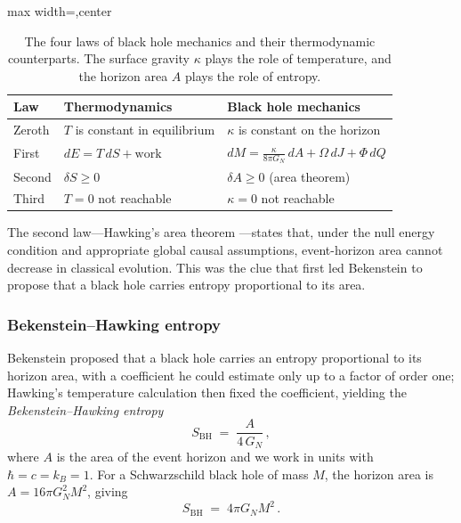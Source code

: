 \documentclass[11pt,letterpaper]{article}
\theoremstyle{plain}
\theoremstyle{definition}
\theoremstyle{remark}
\begin{document}
\begin{table}[ht]
\centering
\caption{The four laws of black hole mechanics and their thermodynamic
counterparts.  The surface gravity $\kappa$ plays the role of temperature,
and the horizon area $A$ plays the role of entropy.}
\label{tab03:four_laws}
\begin{adjustbox}{max width=\textwidth,center}
\begin{tabular}{@{}lll@{}}
\toprule
\textbf{Law} & \textbf{Thermodynamics} & \textbf{Black hole mechanics} \\
\midrule
Zeroth & $T$ is constant in equilibrium & $\kappa$ is constant on the horizon \\
First  & $dE = T\, dS + \text{work}$ & $dM = \frac{\kappa}{8\pi G_{N}}\, dA + \Omega\, dJ + \Phi\, dQ$ \\
Second & $\delta S \geq 0$ & $\delta A \geq 0$ (area theorem) \\
Third  & $T = 0$ not reachable & $\kappa = 0$ not reachable \\
\bottomrule
\end{tabular}
\end{adjustbox}
\end{table}

The second law---Hawking's area theorem \cite{hawking1971area}---states
that, under the null energy condition and appropriate global causal
assumptions, event-horizon area cannot decrease in classical evolution.  This was the clue that first led Bekenstein to propose
that a black hole carries entropy proportional to its area.

\subsubsection*{Bekenstein--Hawking entropy}

Bekenstein \cite{bekenstein1973} proposed that a black hole carries an
entropy proportional to its horizon area, with a coefficient he could
estimate only up to a factor of order one; Hawking's temperature
calculation \cite{hawking1975} then fixed the coefficient, yielding the
\emph{Bekenstein--Hawking entropy}
\begin{equation}\label{eq03:bekenstein_entropy}
  S_{\mathrm{BH}} \;=\; \frac{A}{4\, G_{N}}\,,
\end{equation}
where $A$ is the area of the event horizon and we work in units with
$\hbar = c = k_{B} = 1$.  For a Schwarzschild black hole of mass $M$,
the horizon area is $A = 16\pi G_{N}^{2} M^{2}$, giving
\begin{equation}\label{eq03:sbh_schwarzschild}
  S_{\mathrm{BH}} \;=\; 4\pi G_{N} M^{2}\,.
\end{equation}
\end{document}
